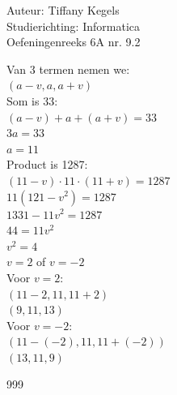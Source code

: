 \documentclass[a4paper]{article}
\begin{document}
  
\noindent \large Auteur: Tiffany Kegels \\
\noindent \large Studierichting: Informatica\\
\noindent \large Oefeningenreeks 6A nr. 9.2\\

\medskip

\normalsize

Van 3 termen nemen we:\\

$(a-v,a,a+v)$\\

Som is 33:\\

$(a-v)+a+(a+v)=33$\\

$3a=33$\\

$a=11$\\

Product is 1287:\\

$(11-v)\cdot11\cdot(11+v)=1287$\\

$11(121-v^2)=1287$\\

$1331-11v^2=1287$\\

$44=11v^2$\\

$v^2=4$\\

$v=2$ of $v=-2$\\

Voor $v=2$:\\

$(11-2,11,11+2)$\\

$(9,11,13)$\\

Voor $v=-2$:\\

$(11-(-2),11,11+(-2))$\\

$(13,11,9)$


\begin{thebibliography}{999}

\end{thebibliography}
\end{document}
